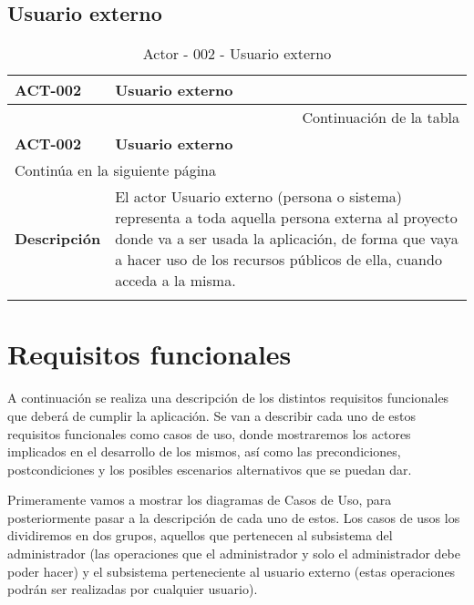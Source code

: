 \subsection{Usuario externo}

\begin{center}
\begin{longtable}{||p{3.4cm}|p{12cm}||}
 \hline \hline \bf ACT-002 &  \bf Usuario externo \\
\hline
\endfirsthead
\hline \multicolumn{2}{|r|}{{Continuación de la tabla}} \\ \hline
 \hline \bf ACT-002 &  \bf Usuario externo \\
\hline
\endhead
\hline \multicolumn{2}{|l|}{{Continúa en la siguiente página}} \\ \hline
\endfoot
\endlastfoot
 \hline \bf Descripción & El actor Usuario externo (persona o sistema)
             representa a toda aquella persona externa al proyecto donde va a
             ser usada la aplicación, de forma que vaya a hacer uso de los
             recursos públicos de ella, cuando acceda a la misma.\\
\hline
\hline
\caption{\label{tab:act002} Actor - 002 - Usuario externo} 
\end{longtable}
\end{center}


\section{Requisitos funcionales}

A continuación se realiza una descripción de los distintos requisitos
funcionales que deberá de cumplir la aplicación. Se van a describir cada uno de
estos requisitos funcionales como casos de uso, donde mostraremos los actores
implicados en el desarrollo de los mismos, así como las precondiciones,
postcondiciones y los posibles escenarios alternativos que se puedan dar.

Primeramente vamos a mostrar los diagramas de Casos de Uso, para posteriormente
pasar a la descripción de cada uno de estos. Los casos de usos los dividiremos
en dos grupos, aquellos que pertenecen al subsistema del administrador (las
operaciones que el administrador y solo el administrador debe poder hacer) y el
subsistema perteneciente al usuario externo (estas operaciones podrán ser
realizadas por cualquier usuario).

